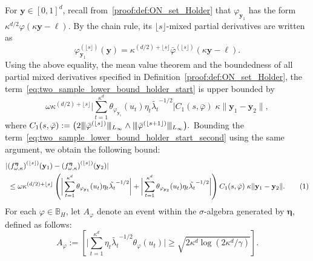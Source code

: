 \documentclass[twoside,11pt]{article}
\newcommand\numberthis{\addtocounter{equation}{1}\tag{\theequation}}
\newcommand{\floor}[1]{\lfloor #1 \rfloor} %
\newcommand{\vectorize}[1]{\mathbf{#1}}
\newcommand{\dimDensity}{d} %
\newcommand{\smoothness}{s}
\newcommand{\ONset}{\mathbb{B}}
\newcommand{\maxErrorTypeOne}{\gamma} %
\newcommand{\binNum}{\kappa}           %
\newcommand{\coef}{\theta}
\newcommand{\wavMotherUnivIndex}{\ell}
\newcommand{\wavMotherIndex}{\boldsymbol{\wavMotherUnivIndex}}
\newcommand{\domainTs}{
	[0,1]^{{\dimDensity}}
}
\begin{document}
\begin{appendix}
	For $\vectorize{y} \in \domainTs$,
	recall from~\eqref{proof:def:ON_set_Holder} that  $\varphi_{\vectorize{y}_1}$ has the form
	$
	\binNum^{\dimDensity/2}
	\varphi(
	\binNum \vectorize{y} - \wavMotherIndex
	)$. 
	By the chain rule, its $\floor{s}$-mixed partial derivatives are written as
	\begin{equation}\label{holder_chainrule}
		\varphi_{\vectorize{y}_1}^{(\floor{s})}(\vectorize{y})
		=
		\kappa^{(\dimDensity/2) + \floor{s}}
		\bar{\varphi}
		^{(\floor{s})}
		(
		\binNum
		\vectorize{y} - \wavMotherIndex
		).
	\end{equation}
	Using the above equality, the mean value theorem and the boundedness of all partial mixed derivatives specified in Definition~\ref{proof:def:ON_set_Holder}, the term~\eqref{eq:two_sample_lower_bound_holder_start} is upper bounded by
	\begin{equation*}\label{eq:two_sample_lower_bound_holder_MVT}
		\omega
		\kappa^{(\dimDensity/2) + \floor{s}}
		\bigg|
		\sum_{t=1}^{\binNum^{\dimDensity}}
		\coef_{\varphi_{\vectorize{y}_1}}(u_t)
		\eta_t
		\tilde{\lambda_t}^{-1/2}
		\bigg|
		C_1(\smoothness, \bar{\varphi})
		\;
		\binNum
		\|\vectorize{y}_1 - \vectorize{y}_2\|,
	\end{equation*}
	where $C_1(\smoothness, \bar{\varphi}) := 
	\bigl(
	2 
	\vert\kern-0.25ex
	\vert\kern-0.25ex
	\vert
	\bar{\varphi}^{(\floor{s})}
	\vert\kern-0.25ex
	\vert\kern-0.25ex
	\vert_{L_\infty}
	\wedge
	\vert\kern-0.25ex
	\vert\kern-0.25ex
	\vert
	\bar{\varphi}^{(\floor{s+1})}
	\vert\kern-0.25ex
	\vert\kern-0.25ex
	\vert_{L_\infty}
	\bigr).
	$
	Bounding the term~\eqref{eq:two_sample_lower_bound_holder_start_second} using the same argument, we obtain the following bound:
	\begin{align*}
		&|
		{(f^{{\boldsymbol{\eta}}}_{\omega, \binNum})}^{ (\floor{s})}(\vectorize{y}_1)
		-
		{(f^{{\boldsymbol{\eta}}}_{\omega, \binNum})}^{ (\floor{s})}(\vectorize{y}_2)
		|
		\\&~\leq
		\omega
		\kappa^{(\dimDensity/2) + \floor{s}}
		\left(
		\bigg|
		\sum_{t=1}^{\binNum^{\dimDensity}}
		\coef_{\varphi_{\vectorize{y}_1}}(u_t)
		\eta_t
		\tilde{\lambda_t}^{-1/2}
		\bigg|
		+
		\bigg|
		\sum_{t=1}^{\binNum^{\dimDensity}}
		\coef_{\varphi_{\vectorize{y}_2}}(u_t)
		\eta_t
		\tilde{\lambda_t}^{-1/2}
		\bigg|
		\right)
		C_1(\smoothness, \bar{\varphi})\;
		\kappa
		\|\vectorize{y}_1-\vectorize{y}_2\|.
		\numberthis
		\label{holder_lipschitz_final_bound_start}
	\end{align*}
	For each \( \varphi \in \ONset_{H} \), let \( A_{\varphi} \) denote an event within the \( \sigma \)-algebra generated by \( \boldsymbol{\eta} \), defined as follows:
	\begin{equation}\label{holder_event}
		A_{\varphi}:= \left[ \big|  \sum_{t=1}^{\binNum^{\dimDensity}} \eta_t \tilde{\lambda_t}^{-1/2} \coef_{\varphi}(u_t) \bigr|
		\geq
		\sqrt{2 \binNum^\dimDensity \log (2 \binNum^\dimDensity / \maxErrorTypeOne )} \right].  
	\end{equation}
	

\end{appendix}
\end{document}
